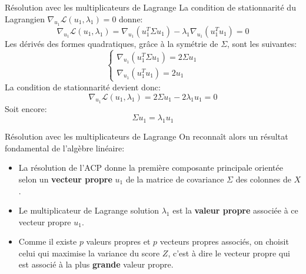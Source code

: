 \begin{frame}{Résolution avec les multiplicateurs de Lagrange}
	La condition de stationnarité du Lagrangien $\nabla_{u_1} \mathcal{L}(u_1, \lambda_1) = 0$ donne:
	\begin{equation}
		\nabla_{u_1} \mathcal{L}(u_1, \lambda_1) = \nabla_{u_1}\left(u_1^T \Sigma u_1\right) - \lambda_1 \nabla_{u_1}\left(u_1^T u_1\right) = 0
		\nonumber
	\end{equation}
	\pause
	Les dérivés des formes quadratiques, grâce à la symétrie de $\Sigma$, sont les suivantes:
	\begin{equation}
		\begin{cases}
			\nabla_{u_1}\left(u_1^T \Sigma u_1\right) = 2 \Sigma u_1 \\
			\nabla_{u_1}\left(u_1^T u_1\right) = 2 u_1
		\end{cases}
		\nonumber
	\end{equation}
	\pause
	La condition de stationnarité devient donc:
	\begin{equation}
		\nabla_{u_1} \mathcal{L}(u_1, \lambda_1) = 2 \Sigma u_1 - 2 \lambda_1 u_1 = 0
		\nonumber
	\end{equation}
	Soit encore:
	\begin{equation}
		\Sigma u_1 = \lambda_1 u_1
		\nonumber
	\end{equation}
\end{frame}

\begin{frame}{Résolution avec les multiplicateurs de Lagrange}
	On reconnaît alors un résultat fondamental de l'algèbre linéaire:
	\begin{itemize}
		\item La résolution de l'ACP donne la première composante principale orientée selon un \textbf{vecteur propre} $u_1$ de la matrice de covariance $\Sigma$ des colonnes de $X$.
		\pause
		\item Le multiplicateur de Lagrange solution $\lambda_1$ est la \textbf{valeur propre} associée à ce vecteur propre $u_1$.
		\pause
		\item Comme il existe $p$ valeurs propres et $p$ vecteurs propres associés, on choisit celui qui maximise la variance du score $Z$, c'est à dire le vecteur propre qui est associé à la plus \textbf{grande} valeur propre.
	\end{itemize}
\end{frame}

